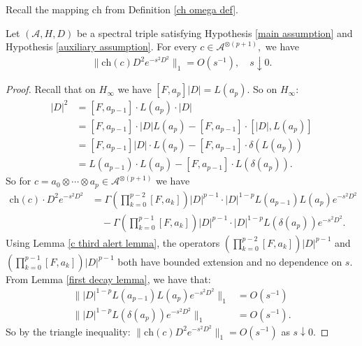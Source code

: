     Recall the mapping $\mathrm{ch}$ from Definition \ref{ch omega def}.
    \begin{lem}\label{kogom pre 5} 
        Let $(\mathcal{A},H,D)$ be a spectral triple satisfying Hypothesis \ref{main assumption} and Hypothesis \ref{auxiliary assumption}. For every $c\in\mathcal{A}^{\otimes (p+1)},$ we have
        \begin{align*}
            \|\mathrm{ch}(c)D^2e^{-s^2D^2}\|_1 = O(s^{-1}),\quad s \downarrow 0.
        \end{align*}
    \end{lem}
    \begin{proof} 
        Recall that on $H_\infty$ we have $[F,a_p]|D| = L(a_p)$.
        So on $H_\infty$:
        \begin{align*}
            [F,a_{p-1}][F,a_p]|D|^2 &= [F,a_{p-1}]\cdot L(a_p)\cdot|D|\\
                                    &= [F,a_{p-1}]\cdot |D|L(a_p)-[F,a_{p-1}]\cdot [|D|,L(a_p)]\\
                                    &= [F,a_{p-1}]|D|\cdot L(a_p)-[F,a_{p-1}]\cdot\delta(L(a_p))\\
                                    &= L(a_{p-1})\cdot L(a_p)-[F,a_{p-1}]\cdot L(\delta(a_p)).
        \end{align*}
        So for $c=a_0\otimes\cdots\otimes a_p \in \mathcal{A}^{\otimes(p+1)}$ we have
        \begin{align*}
            \mathrm{ch}(c)\cdot D^2e^{-s^2D^2} &= \Gamma\left(\prod_{k=0}^{p-2}[F,a_k]\right) |D|^{p-1}\cdot |D|^{1-p}L(a_{p-1})L(a_p)e^{-s^2D^2}\\
                                       &\quad-\Gamma\left(\prod_{k=0}^{p-1}[F,a_k]\right)|D|^{p-1}\cdot|D|^{1-p}L(\delta(a_p))e^{-s^2D^2}.
        \end{align*}
        Using Lemma \ref{c third alert lemma}, the operators $\left(\prod_{k=0}^{p-2}[F,a_k]\right)|D|^{p-1}$ and $\left(\prod_{k=0}^{p-1}[F,a_k]\right)|D|^{p-1}$ both
        have bounded extension and no dependence on $s$.
        From Lemma \ref{first decay lemma}, we have that:
        \begin{align*}
            \||D|^{1-p}L(a_{p-1})L(a_p)e^{-s^2D^2}\|_1 &= O(s^{-1})\\
              \||D|^{1-p}L(\delta(a_p))e^{-s^2D^2}\|_1 &= O(s^{-1}).
        \end{align*}
        So by the triangle inequality: $\|\mathrm{ch}(c)D^2e^{-s^2D^2}\|_1 = O(s^{-1})$ as $s\downarrow 0$.
    \end{proof}
            
